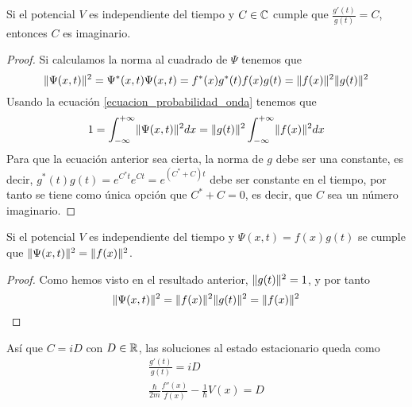 \begin{resultado}
    Si el potencial $V$ es independiente del tiempo y $C\in\mathbb{C}$ cumple que $\frac{g'(t)}{g(t)}=C$, entonces $C$ es imaginario.
\end{resultado}
\begin{proof}
    Si calculamos la norma al cuadrado de $\Psi$ tenemos que
    \begin{equation*}
        \lVert\Psi(x,t)\rVert^2=\Psi^*(x,t)\Psi(x,t)=f^*(x)g^*(t)f(x)g(t)=\lVert f(x)\rVert^2\lVert g(t)\rVert^2
    \end{equation*}
    Usando la ecuación \ref{ecuacion_probabilidad_onda} tenemos que
    \begin{equation*}
        1=\int_{-\infty}^{+\infty}\lVert\Psi(x,t)\rVert^2 dx=\lVert g(t)\rVert^2\int_{-\infty}^{+\infty}\lVert f(x)\rVert^2 dx
    \end{equation*}
    Para que la ecuación anterior sea cierta, la norma de $g$ debe ser una constante, es decir, $g^*(t)g(t)=e^{C^*t}e^{Ct}=e^{(C^*+C)t}$ debe ser constante en el tiempo, por tanto se tiene como única opción que $C^*+C=0$, es decir, que $C$ sea un número imaginario.
\end{proof}

\begin{resultado}
    Si el potencial $V$ es independiente del tiempo y $\Psi(x,t)=f(x)g(t)$ se cumple que $\lVert\Psi(x,t)\rVert^2=\lVert f(x)\rVert^2$.
\end{resultado}
\begin{proof}
    Como hemos visto en el resultado anterior, $\lVert g(t)\rVert^2=1$, y por tanto
    \begin{equation}
        \label{probabilidad_atemporal}
        \lVert\Psi(x,t)\rVert^2=\lVert f(x)\rVert^2\lVert g(t)\rVert^2=\lVert f(x)\rVert^2
    \end{equation}
\end{proof}
Así que $C=iD$ con $D\in\mathbb{R}$, las soluciones al estado estacionario queda como
\begin{gather*}
    \frac{g'(t)}{g(t)}=iD
    \\
    \frac{\hbar}{2m}\frac{f''(x)}{f(x)}-\frac{1}{\hbar}V(x)=D
\end{gather*}

